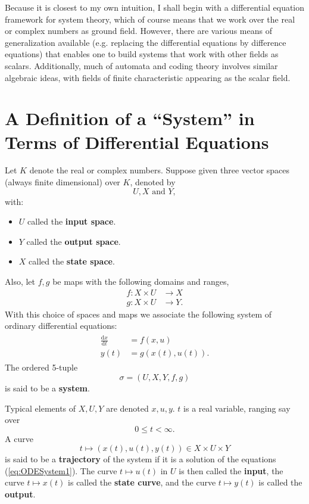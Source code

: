 \documentclass[12pt]{book}
\theoremstyle{plain}
\theoremstyle{definition}
\newcommand{\dd}[1]{\mathrm{d}#1}
\begin{document}
Because it is closest to my own intuition, I shall begin with a differential equation framework for system theory, which of course means that we work over the real or complex numbers as ground field.
However, there are various means of generalization available (e.g. replacing the differential equations by difference equations) that enables one to build systems that work with other fields as scalars.
Additionally, much of automata and coding theory involves similar algebraic ideas, with fields of finite characteristic appearing as the scalar field.

\section{A Definition of a ``System'' in Terms of Differential Equations}

Let $K$ denote the real or complex numbers.
Suppose given three vector spaces (always finite dimensional) over $K$, denoted by
$$U, X \text{ and } Y,$$
with:
\begin{itemize}
    \item $U$ called the \textbf{input space}.
    \item $Y$ called the \textbf{output space}.
    \item $X$ called the \textbf{state space}.
\end{itemize}
Also, let $f, g$ be maps with the following domains and ranges,
\begin{align}
    f: X \times U &\to X \\
    g: X \times U &\to Y.
\end{align}
With this choice of spaces and maps we associate the following system of ordinary differential equations:
\begin{align}
\begin{split} \label{eq:ODESystem1}
    \frac{\dd{x}}{\dd{t}} &= f(x, u) \\
    y(t) &= g(x(t), u(t)).
\end{split}
\end{align}
The ordered 5-tuple
$$\sigma = (U, X, Y, f, g)$$
is said to be a \textbf{system}.

Typical elements of $X, U, Y$ are denoted $x, u, y$. $t$ is a real variable, ranging say over
$$0 \leq t < \infty.$$
A curve
$$t \mapsto (x(t), u(t), y(t)) \in X \times U \times Y$$
is said to be a \textbf{trajectory} of the system if it is a solution of the equations (\ref{eq:ODESystem1}).
The curve $t \mapsto u(t)$ in $U$ is then called the \textbf{input}, the curve $t \mapsto x(t)$ is called the \textbf{state curve}, and the curve $t \mapsto y(t)$ is called the \textbf{output}.
\end{document}

